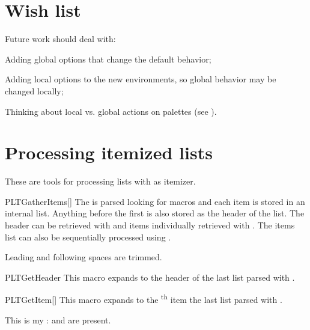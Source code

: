 \documentclass[a4paper, 11pt]{article}
\begin{document}
\section{Wish list}

Future work should deal with:
\begin{itemizeitemize}
    \item Adding global options that change the default behavior;
    \item Adding local options to the new environments, so global behavior may be changed locally;
    \item Thinking about local vs. global actions on palettes (see ).
\end{itemizeitemize}

\clearpage
\appendix


\section{Processing itemized lists}\label{sec:getitems}
These are tools for processing lists with  as itemizer.

\begin{macro}{PLTGatherItems}[]
    The  is parsed looking for  macros and each item is stored in an internal list. Anything before the first  is also stored as the header of the list. The header can be retrieved with  and items individually retrieved with . The items list can also be sequentially processed using .

    Leading and following spaces are trimmed.
\end{macro}

\begin{macro}{PLTGetHeader}
    This macro expands to the header of the last list parsed with .
\end{macro}

\begin{macro}{PLTGetItem}[]
    This macro expands to the \textsuperscript{th} item the last list parsed with .
\end{macro}

\begin{example}{}

    This is my \PLTGetHeader:  and  are present.
\end{example}
\end{document}
